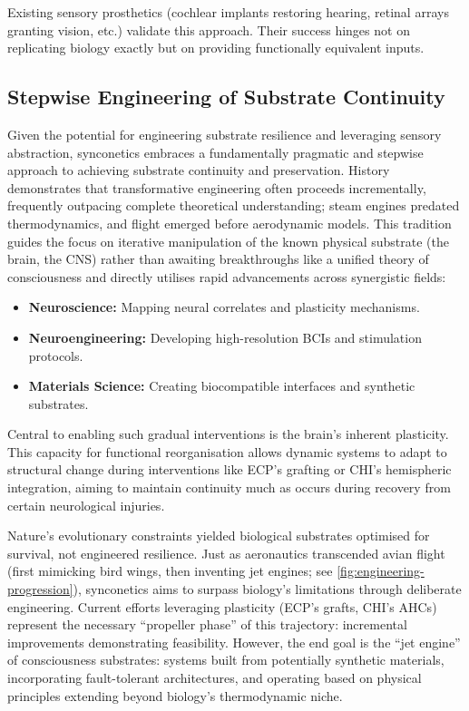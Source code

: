 \documentclass[10pt]{article}
\begin{document}
\begin{sloppypar}
  Existing sensory prosthetics (cochlear implants restoring hearing, retinal arrays granting vision, etc.) validate this approach. Their success hinges not on replicating biology exactly but on providing functionally equivalent inputs.

  \subsection{Stepwise Engineering of Substrate Continuity}
  \label{sec:pragmatic-path-forward}

  Given the potential for engineering substrate resilience and leveraging sensory abstraction, synconetics embraces a fundamentally pragmatic and stepwise approach to achieving substrate continuity and preservation. History demonstrates that transformative engineering often proceeds incrementally, frequently outpacing complete theoretical understanding; steam engines predated thermodynamics, and flight emerged before aerodynamic models. This tradition guides the focus on iterative manipulation of the known physical substrate (the brain, the CNS) rather than awaiting breakthroughs like a unified theory of consciousness and directly utilises rapid advancements across synergistic fields:

  \begin{itemize}
    \item \textbf{Neuroscience:} Mapping neural correlates and plasticity mechanisms.
    \item \textbf{Neuroengineering:} Developing high-resolution BCIs and stimulation protocols.
    \item \textbf{Materials Science:} Creating biocompatible interfaces and synthetic substrates.
  \end{itemize}

  Central to enabling such gradual interventions is the brain’s inherent plasticity. This capacity for functional reorganisation allows dynamic systems to adapt to structural change during interventions like ECP’s grafting or CHI’s hemispheric integration, aiming to maintain continuity much as occurs during recovery from certain neurological injuries.

  Nature’s evolutionary constraints yielded biological substrates optimised for survival, not engineered resilience. Just as aeronautics transcended avian flight (first mimicking bird wings, then inventing jet engines; see \autoref{fig:engineering-progression}), synconetics aims to surpass biology’s limitations through deliberate engineering. Current efforts leveraging plasticity (ECP’s grafts, CHI’s AHCs) represent the necessary “propeller phase” of this trajectory: incremental improvements demonstrating feasibility. However, the end goal is the “jet engine” of consciousness substrates: systems built from potentially synthetic materials, incorporating fault-tolerant architectures, and operating based on physical principles extending beyond biology’s thermodynamic niche.


\end{sloppypar}
\end{document}
